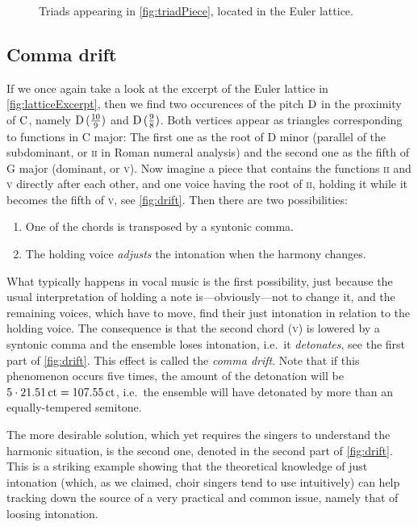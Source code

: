 \documentclass[british,11pt]{scrartcl}
\begin{document}
\begin{figure}
  
  \caption{Triads appearing in \cref{fig:triadPiece}, located in the Euler
    lattice.}\label{fig:chordsLattice}
\end{figure}

\subsection{Comma drift}

If we once again take a look at the excerpt of the Euler lattice in
\cref{fig:latticeExcerpt}, then we find two occurences of the pitch $\text{D}$ in the
proximity of $\text{C}$, namely \naturalm $\text{D}\,(\frac{10}9)$ and $\text{D}\,(\frac98)$. Both
vertices appear as triangles corresponding to functions in C major: The first
one as the root of D minor (parallel of the subdominant, or \textsc{ii} in Roman
numeral analysis) and the second one as the fifth of G major (dominant, or
\textsc{v}).  Now imagine a piece that contains the functions \textsc{ii} and
\textsc{v} directly after each other, and one voice having the root of
\textsc{ii}, holding it while it becomes the fifth of \textsc{v}, see
\cref{fig:drift}.  Then there are two possibilities:

\begin{enumerate}[itemsep=0em]
\item One of the chords is transposed by a syntonic comma.
\item The holding voice \emph{adjusts} the intonation when the harmony changes.
\end{enumerate}%
%
What typically happens in vocal music is the first possibility, just because the
usual interpretation of holding a note is—obviously—not to change it, and the
remaining voices, which have to move, find their just intonation in relation to
the holding voice.  The consequence is that the second chord (\textsc{v}) is
lowered by a syntonic comma and the ensemble loses intonation, i.e.\ it
\emph{detonates}, see the first part of \cref{fig:drift}.  This effect is called
the \emph{comma drift}.  Note that if this phenomenon occurs five times, the
amount of the detonation will be $5\cdot 21.51\,\mathrm{ct}=107.55\,\mathrm{ct}$, i.e.\
the ensemble will have detonated by more than an equally-tempered semitone.

The more desirable solution, which yet requires the singers to understand the
harmonic situation, is the second one, denoted in the second part of
\cref{fig:drift}.  This is a striking example showing that the theoretical
knowledge of just intonation (which, as we claimed, choir singers tend to use
intuitively) can help tracking down the source of a very practical and common
issue, namely that of loosing intonation.
\end{document}
